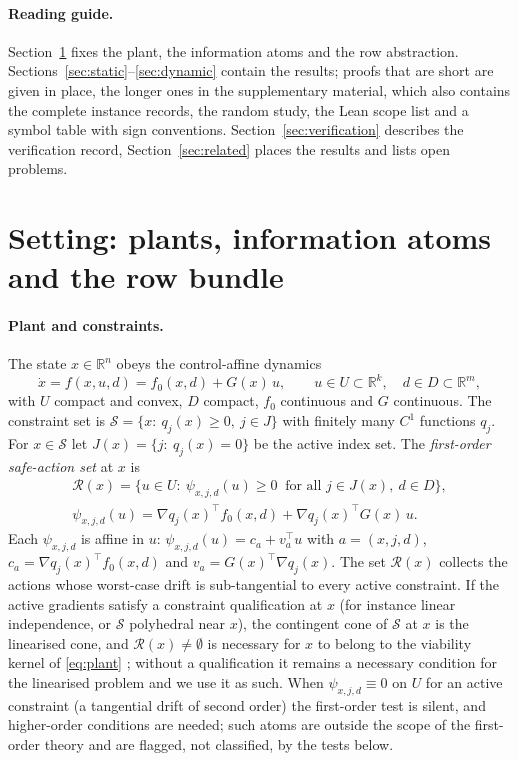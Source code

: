 \documentclass[11pt,a4paper]{article}
\theoremstyle{plain}
\theoremstyle{definition}
\theoremstyle{remark}
\newcommand{\R}{\mathbb{R}}
\newcommand{\calR}{\mathcal{R}}
\newcommand{\calS}{\mathcal{S}}
\begin{document}
\paragraph{Reading guide.} Section~\ref{sec:setting} fixes the plant, the information atoms and the row abstraction. Sections~\ref{sec:static}--\ref{sec:dynamic} contain the results; proofs that are short are given in place, the longer ones in the supplementary material, which also contains the complete instance records, the random study, the Lean scope list and a symbol table with sign conventions. Section~\ref{sec:verification} describes the verification record, Section~\ref{sec:related} places the results and lists open problems.
\section{Setting: plants, information atoms and the row bundle}\label{sec:setting}

\paragraph{Plant and constraints.} The state $x\in\R^n$ obeys the control-affine dynamics
\begin{equation}\label{eq:plant}
\dot x=f(x,u,d)=f_0(x,d)+G(x)\,u,\qquad u\in U\subset\R^k,\quad d\in D\subset\R^m,
\end{equation}
with $U$ compact and convex, $D$ compact, $f_0$ continuous and $G$ continuous. The constraint set is $\calS=\{x:\ q_j(x)\ge0,\ j\in J\}$ with finitely many $C^1$ functions $q_j$. For $x\in\calS$ let $J(x)=\{j:\ q_j(x)=0\}$ be the active index set. The \emph{first-order safe-action set} at $x$ is
\begin{equation}\label{eq:R}
\begin{gathered}
\calR(x)=\bigl\{u\in U:\ \psi_{x,j,d}(u)\ge0\ \text{ for all } j\in J(x),\ d\in D\bigr\},\\
\psi_{x,j,d}(u)=\nabla q_j(x)^{\!\top}f_0(x,d)+\nabla q_j(x)^{\!\top}G(x)\,u .
\end{gathered}
\end{equation}
Each $\psi_{x,j,d}$ is affine in $u$: $\psi_{x,j,d}(u)=c_a+v_a^{\top}u$ with $a=(x,j,d)$, $c_a=\nabla q_j(x)^\top f_0(x,d)$ and $v_a=G(x)^\top\nabla q_j(x)$. The set $\calR(x)$ collects the actions whose worst-case drift is sub-tangential to every active constraint. If the active gradients satisfy a constraint qualification at $x$ (for instance linear independence, or $\calS$ polyhedral near $x$), the contingent cone of $\calS$ at $x$ is the linearised cone, and $\calR(x)\neq\emptyset$ is necessary for $x$ to belong to the viability kernel of \eqref{eq:plant} \cite{Aubin1991,Nagumo1942}; without a qualification it remains a necessary condition for the linearised problem and we use it as such. When $\psi_{x,j,d}\equiv0$ on $U$ for an active constraint (a tangential drift of second order) the first-order test is silent, and higher-order conditions are needed; such atoms are outside the scope of the first-order theory and are flagged, not classified, by the tests below.
\end{document}

